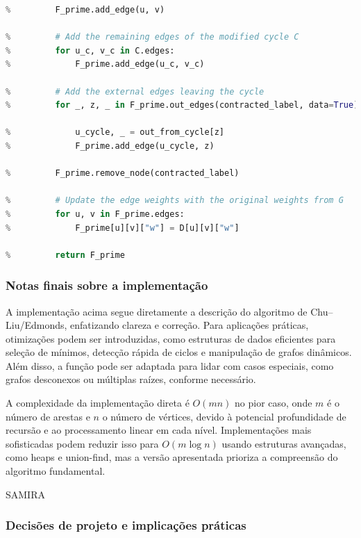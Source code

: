 \begin{tcolorbox}
\begin{lstlisting}[mathescape=true, language=Python]
%         # Add the external edge entering the cycle (identified by in_edge), the weight will be corrected at the end using G
%         F_prime.add_edge(u, v)

%         # Add the remaining edges of the modified cycle C
%         for u_c, v_c in C.edges:
%             F_prime.add_edge(u_c, v_c)
            
%         # Add the external edges leaving the cycle
%         for _, z, _ in F_prime.out_edges(contracted_label, data=True):

%             u_cycle, _ = out_from_cycle[z]
%             F_prime.add_edge(u_cycle, z)

%         F_prime.remove_node(contracted_label)

%         # Update the edge weights with the original weights from G
%         for u, v in F_prime.edges:
%             F_prime[u][v]["w"] = D[u][v]["w"]

%         return F_prime 
\end{lstlisting}
\end{tcolorbox}

\subsubsection{Notas finais sobre a implementação}

A implementação acima segue diretamente a descrição do algoritmo de Chu–Liu/Edmonds, enfatizando clareza e correção. Para aplicações práticas, otimizações podem ser introduzidas, como estruturas de dados eficientes para seleção de mínimos, detecção rápida de ciclos e manipulação de grafos dinâmicos. Além disso, a função pode ser adaptada para lidar com casos especiais, como grafos desconexos ou múltiplas raízes, conforme necessário.


A complexidade da implementação direta é \(O(mn)\) no pior caso, onde \(m\) é o número de arestas e \(n\) o número de vértices, devido à potencial profundidade de recursão e ao processamento linear em cada nível. Implementações mais sofisticadas podem reduzir isso para \(O(m \log n)\) usando estruturas avançadas, como heaps e union-find, mas a versão apresentada prioriza a compreensão do algoritmo fundamental.

SAMIRA
\subsubsection{Decisões de projeto e implicações práticas}


